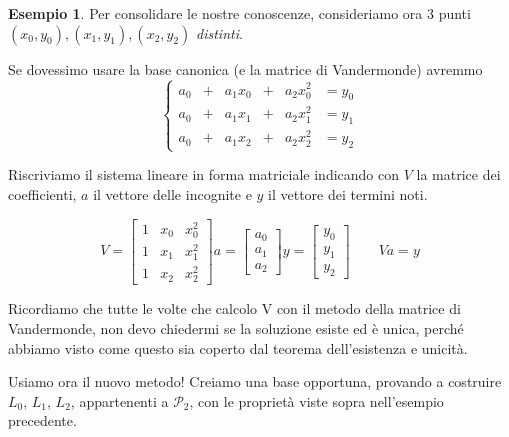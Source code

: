 \documentclass{article}
\theoremstyle{plain}
\theoremstyle{plain}
\theoremstyle{definition}
\theoremstyle{definition}
\newtheorem{esempio}{Esempio}
\begin{document}
\begin{esempio}
	Per consolidare le nostre conoscenze, consideriamo ora 3 punti $(x_{0}, y_{0}), (x_{1}, y_{1}), (x_{2}, y_{2})$ \emph{distinti}.
	
	Se dovessimo usare la base canonica (e la matrice di Vandermonde) avremmo
	\begin{equation*}
		\left\{
		\begin{alignedat}{3}
			a_{0} & +{} &  a_{1}x_{0} & +{} & a_{2}x_{0}^2 & = y_{0} \\
			a_{0} & +{} &  a_{1}x_{1} & +{} &  a_{2}x_{1}^2 & = y_{1} \\
			a_{0} & +{} & a_{1}x_{2} & +{} & a_{2}x_{2}^2 & = y_{2}
		\end{alignedat}
		\right.
	\end{equation*}
	
	Riscriviamo il sistema lineare in forma matriciale indicando con $V$ la matrice dei coefficienti, $a$ il vettore delle incognite e $y$ il vettore dei termini noti.
	
	\[
	V=
	\begin{bmatrix}
		1 & x_{0} & x_{0}^2 \\
		1 & x_{1} & x_{1}^2 \\
		1 & x_{2} & x_{2}^2 
	\end{bmatrix}
	a=
	\begin{bmatrix}
		a_{0} \\
		a_{1} \\
		a_{2}
	\end{bmatrix}
	y=
	\begin{bmatrix}
		y_{0} \\
		y_{1} \\
		y_{2}
	\end{bmatrix}
	\qquad
	Va=y
	\]
	
	Ricordiamo che tutte le volte che calcolo V con il metodo della matrice di Vandermonde, non devo chiedermi se la soluzione esiste ed è unica, perché abbiamo visto come questo sia coperto dal teorema dell'esistenza e unicità.
	
	Usiamo ora il nuovo metodo! Creiamo una base opportuna, provando a costruire $L_{0}$, $L_{1}$, $L_{2}$, appartenenti a $\mathcal{P}_{2}$, con le proprietà viste sopra nell'esempio precedente.
	

\end{esempio}
\end{document}
